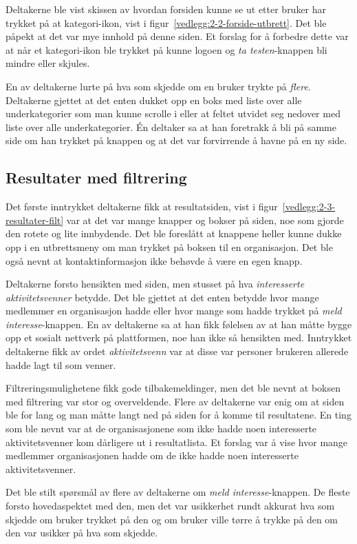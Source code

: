 Deltakerne ble vist skissen av hvordan forsiden kunne se ut etter bruker har trykket på at kategori-ikon, vist i figur~\ref{vedlegg:2-2-forside-utbrett}. Det ble påpekt at det var mye innhold på denne siden. Et forslag for å forbedre dette var at når et kategori-ikon ble trykket på kunne logoen og {\em ta testen}-knappen bli mindre eller skjules. 

En av deltakerne lurte på hva som skjedde om en bruker trykte på {\em flere}. Deltakerne gjettet at det enten dukket opp en boks med liste over alle underkategorier som man kunne scrolle i eller at feltet utvidet seg nedover med liste over alle underkategorier. Én deltaker sa at han foretrakk å bli på samme side om han trykket på knappen og at det var forvirrende å havne på en ny side.


\subsection{Resultater med filtrering}

Det første inntrykket deltakerne fikk at resultatsiden, vist i figur~\ref{vedlegg:2-3-resultater-filt} var at det var mange knapper og bokser på siden, noe som gjorde den rotete og lite innbydende. Det ble foreslått at knappene heller kunne dukke opp i en utbrettsmeny om man trykket på boksen til en organisasjon. Det ble også nevnt at kontaktinformasjon ikke behøvde å være en egen knapp.

Deltakerne forsto hensikten med siden, men stusset på hva {\em interesserte aktivitetsvenner} betydde. Det ble gjettet at det enten betydde hvor mange medlemmer en organisasjon hadde eller hvor mange som hadde trykket på {\em meld interesse}-knappen. En av deltakerne sa at han fikk følelsen av at han måtte bygge opp et sosialt nettverk på plattformen, noe han ikke så hensikten med. Inntrykket deltakerne fikk av ordet {\em aktivitetsvenn} var at disse var personer brukeren allerede hadde lagt til som venner.

Filtreringsmulighetene fikk gode tilbakemeldinger, men det ble nevnt at boksen med filtrering var stor og overveldende. Flere av deltakerne var enig om at siden ble for lang og man måtte langt ned på siden for å komme til resultatene. En ting som ble nevnt var at de organisasjonene som ikke hadde noen interesserte aktivitetsvenner kom dårligere ut i resultatlista. Et forslag var å vise hvor mange medlemmer organisasjonen hadde om de ikke hadde noen interesserte aktivitetsvenner.

Det ble stilt spørsmål av flere av deltakerne om {\em meld interesse}-knappen. De fleste forsto hovedaspektet med den, men det var usikkerhet rundt akkurat hva som skjedde om bruker trykket på den og om bruker ville tørre å trykke på den om den var usikker på hva som skjedde.



